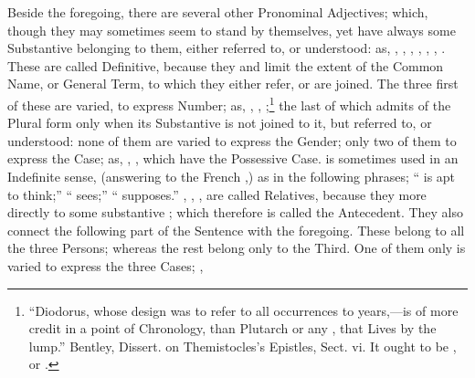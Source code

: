 Beside the foregoing, there are several other Pronominal Adjectives;
which, though they may sometimes seem to stand by themselves, yet have
always some Substantive belonging to them, either referred to, or
understood: as, , , , , ,
, . These are called Definitive, because they
 and limit the extent of the Common Name, or General Term, to
which they either refer, or are joined. The three first of these are
varied, to express Number; as, , ,
;\footnote{``Diodorus, whose design was to refer to all
  occurrences to years,---is of more credit in a point of Chronology,
  than Plutarch or any , that  Lives by the lump.''
  Bentley, Dissert. on Themistocles's Epistles, Sect. vi. It ought to be
, or .} the last of which admits of the Plural
form only when its Substantive is not joined to it, but referred to, or
understood: none of them are varied to express the Gender; only two of
them to express the Case; as, , , which have the
Possessive Case.  is sometimes used in an Indefinite sense,
(answering to the French ,) as in the following phrases;
`` is apt to think;'' `` sees;'' `` supposes.''
, , , are called Relatives, because they more
directly  to some substantive ; which
therefore is called the Antecedent. They also connect the following part
of the Sentence with the foregoing. These belong to all the three
Persons; whereas the rest belong only to the Third. One of them only is
varied to express the three Cases; ,
